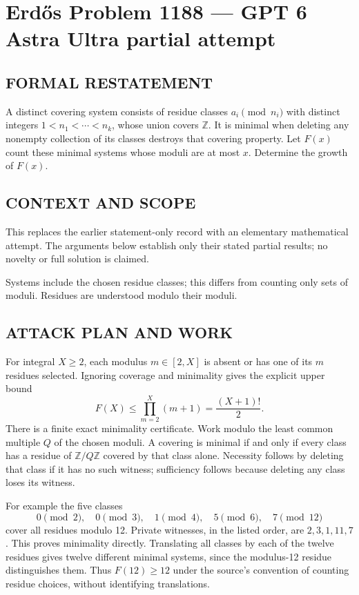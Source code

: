 \section*{Erd\H{o}s Problem 1188 --- GPT 6 Astra Ultra partial attempt}


\subsection*{FORMAL RESTATEMENT}
A distinct covering system consists of residue classes $a_i\pmod{n_i}$ with distinct integers $1<n_1<\cdots<n_k$, whose union covers $\mathbb Z$. It is minimal when deleting any nonempty collection of its classes destroys that covering property. Let $F(x)$ count these minimal systems whose moduli are at most $x$. Determine the growth of $F(x)$.

\subsection*{CONTEXT AND SCOPE}
This replaces the earlier statement-only record with an elementary mathematical attempt. The arguments below establish only their stated partial results; no novelty or full solution is claimed.

Systems include the chosen residue classes; this differs from counting only sets of moduli. Residues are understood modulo their moduli.

\subsection*{ATTACK PLAN AND WORK}
For integral $X\ge2$, each modulus $m\in[2,X]$ is absent or has one of its $m$
residues selected. Ignoring coverage and minimality gives the explicit upper bound
\[F(X)\le\prod_{m=2}^X(m+1)=\frac{(X+1)!}{2}.\tag{1}\]
There is a finite exact minimality certificate. Work modulo the least common
multiple $Q$ of the chosen moduli. A covering is minimal if and only if every
class has a residue of $\mathbb Z/Q\mathbb Z$ covered by that class alone.
Necessity follows by deleting that class if it has no such witness; sufficiency
follows because deleting any class loses its witness.

For example the five classes
\[0\pmod2,\quad0\pmod3,\quad1\pmod4,\quad5\pmod6,\quad7\pmod{12}\]
cover all residues modulo 12. Private witnesses, in the listed order, are
$2,3,1,11,7$. This proves minimality directly. Translating all classes by each
of the twelve residues gives twelve different minimal systems, since the
modulus-12 residue distinguishes them. Thus $F(12)\ge12$ under the source's
convention of counting residue choices, without identifying translations.

